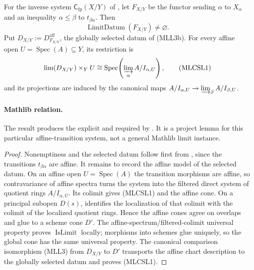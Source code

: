 \begin{lemma}
  \label{lemma:nagata-closed-subscheme-fp-limit-datum}

  For the inverse system
  $\mathsf C_{\mathrm{fp}}(X/Y)$ of
  , let
  $F_{X/Y}$ be the functor sending $\alpha$ to $X_\alpha$ and an inequality
  $\alpha\leq\beta$ to $t_{\beta\alpha}$.  Then
  \[
    \operatorname{LimitDatum}(F_{X/Y})\neq\varnothing.           \tag{MLCSL0}
  \]
  Put
  $D_{X/Y}:=D_{F_{X/Y}}^{\mathrm{aff}}$, the globally selected datum of
  (MLL3b).  For every affine open
  $U=\operatorname{Spec}(A)\subseteq Y$, its restriction is
  \[
    \lim(D_{X/Y})\times_YU
      \cong
    \operatorname{Spec}\!\left(
      \varinjlim_\alpha A/I_{\alpha,U}\right),                  \tag{MLCSL1}
  \]
  and its projections are induced by the canonical maps
  $A/I_{\alpha,U}\to\varinjlim_\beta A/I_{\beta,U}$.

  \paragraph{Mathlib relation.}
  The result produces the explicit
  \texttt{} and
  \texttt{} required by
  .  It is a project lemma for this particular
  affine-transition system, not a general Mathlib limit instance.
\end{lemma}

\begin{proof}
  Nonemptiness and the selected datum follow first from
  , since the
  transitions $t_{\beta\alpha}$ are affine.  It remains to record the affine
  model of the selected datum.
  On an affine open $U=\operatorname{Spec}(A)$ the transition morphisms are
  affine, so contravariance of affine spectra turns the system into the
  filtered direct system of quotient rings $A/I_{\alpha,U}$.  Its colimit
  gives (MLCSL1) and the affine cone.  On a principal subopen $D(s)$,
   identifies the
  localization of that colimit with the colimit of the localized quotient
  rings.  Hence the affine cones agree on overlaps and glue to a scheme cone
  $D'$.
  The affine-spectrum/filtered-colimit universal property proves
  $\operatorname{IsLimit}$ locally; morphisms into schemes glue uniquely, so
  the global cone has the same universal property.  The canonical comparison
  isomorphism (MLL3) from $D_{X/Y}$ to $D'$ transports the affine chart
  description to the globally selected datum and proves (MLCSL1).
\end{proof}


